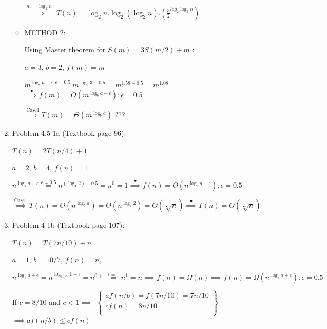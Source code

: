 \documentclass[11pt]{article}
\begin{document}
\begin{enumerate}
\begin{itemize}
		$ \overset{m=\log_2{n}}{\implies} $ 
		$T(n) = \log_2{n}.\log_2{(\log_2{n})}.( \frac{3}{2}^{log_2{\log_2{n}}}   )  $
    \end{itemize}	
	

	\begin{itemize}
	    \item METHOD 2:
	    
	    Using Master theorem for $ S(m) = 3S(m/2) + m$ :
	    
    	$a=3$, $b=2$, $f(m)=m$
    	
    	$m^{\log_b{a}-\epsilon} \overset{\epsilon=0.5}{=} m^{\log_{2}{3}-0.5}=m^{1.58-0.5}=m^{1.08}$  
	    $\overset{\mathrm{•}}{\implies} f(m)=O(m^{\log_b{a}-\epsilon}):\epsilon=0.5$
	    
	    $\overset{\mathrm{Case 1}}{\implies} T(m)=\Theta(m^{\log_b{a}})$	
	    $ ???$	
  		 

    \end{itemize}
	
	
	
	

	
	
	 
\pagebreak
	
\item Problem 4.5-1a (Textbook page 96):
	
	$T(n)=2T(n/4)+1$
	
	$a=2$, $b=4$, $f(n)=1$
	
	$n^{\log_b{a}-\epsilon} \overset{\epsilon=0.5}{=} n^{(\log_4{2})-0.5}=n^{0}=1
	\overset{\mathrm{•}}{\implies} f(n)=O(n^{\log_b{a}-\epsilon}):\epsilon=0.5$
	
	$\overset{\mathrm{Case 1}}{\implies} T(n)=\Theta(n^{\log_b{a}})=\Theta(n^{\log_4{2}})=\Theta(\sqrt[•]{n}) 
	\overset{\mathrm{•}}{\implies} T(n)=\Theta(\sqrt[•]{n}) $ 







\item Problem 4-1b (Textbook page 107):

	$T(n)=T(7n/10)+n$

	$a=1$, $b=10/7$, $f(n)=n$, 
	
	$n^{\log_b{a}+\epsilon} \overset{}{=} n^{\log_{10/7}{1}+\epsilon}=n^{0+\epsilon}\overset{\epsilon = 1}{=}n^{1}=n  
	\overset{}{\implies} f(n)=\Omega(n)
	\overset{}{\implies} f(n)=\Omega(n^{\log_b{a}+\epsilon}):\epsilon=0.5$
	
	If $c=8/10$ and $c<1 \overset{}{\implies} $
	$
	    \left\{\begin{array}{lr}
        	af(n/b)=f(7n/10)=7n/10\\
        	cf(n)=8n/10\\
        \end{array}\right\}
    $
    $ \overset{}{\implies} af(n/b)\leq cf(n)$
    

\end{enumerate}
\end{document}
